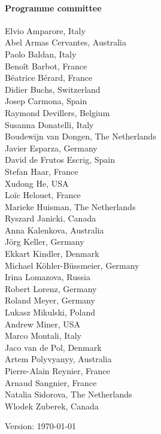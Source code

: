 \documentclass[10pt]{article}
\begin{document}

\newpage
\paragraph*{Programme committee}\mbox{}
\begin{multicols}{2}
\noindent
Elvio Amparore, Italy \\
Abel Armas Cervantes, Australia \\
Paolo Baldan, Italy \\
Beno\^{i}t Barbot, France  \\
B\'{e}atrice B\'{e}rard, France \\
Didier Buchs, Switzerland \\
Josep Carmona, Spain \\
Raymond Devillers, Belgium \\
Susanna Donatelli, Italy \\
Boudewijn van Dongen, The Netherlands \\
Javier Esparza, Germany \\
David de Frutos Escrig, Spain \\
Stefan Haar, France \\
Xudong He, USA \\
Lo\"{i}c Helouet, France \\
Marieke Huisman, The Netherlands \\
\columnbreak
Ryszard Janicki, Canada \\
Anna Kalenkova, Australia \\
J\"{o}rg Keller, Germany \\
Ekkart Kindler, Denmark \\
Michael K\"{o}hler-B\"{u}ssmeier, Germany \\
Irina Lomazova, Russia \\
Robert Lorenz, Germany \\
Roland Meyer, Germany \\
Lukasz Mikulski, Poland \\
Andrew Miner, USA \\
Marco Montali, Italy \\
Jaco van de Pol, Denmark \\
Artem Polyvyanyy, Australia \\
Pierre-Alain Reynier, France \\
Arnaud Sangnier, France \\
Natalia Sidorova, The Netherlands \\
Wlodek Zuberek, Canada

{\tiny \textcolor{black!2}{Version: \today{}}}
\end{multicols}
\end{document}
